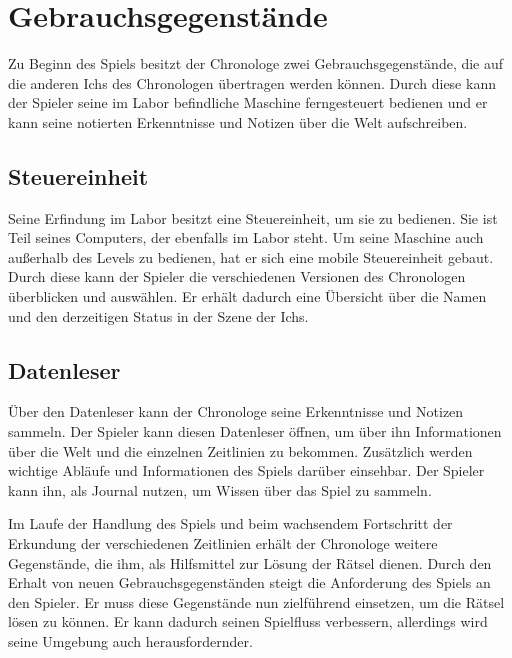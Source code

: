 \section{Gebrauchsgegenstände}
Zu Beginn des Spiels besitzt der Chronologe zwei Gebrauchsgegenstände, die auf die anderen Ichs des Chronologen übertragen werden können. Durch diese kann der Spieler seine im Labor befindliche Maschine ferngesteuert bedienen und er kann seine notierten Erkenntnisse und Notizen über die Welt aufschreiben.

\subsection{Steuereinheit}
Seine Erfindung im Labor besitzt eine Steuereinheit, um sie zu bedienen. Sie ist Teil seines Computers, der ebenfalls im Labor steht. Um seine Maschine auch außerhalb des Levels zu bedienen, hat er sich eine mobile Steuereinheit gebaut. Durch diese kann der Spieler die verschiedenen Versionen des Chronologen überblicken und auswählen. Er erhält dadurch eine Übersicht über die Namen und den derzeitigen Status in der Szene der Ichs.

\subsection{Datenleser}\label{sec:concept_datenleser}
Über den Datenleser kann der Chronologe seine Erkenntnisse und Notizen sammeln. Der Spieler kann diesen Datenleser öffnen, um über ihn Informationen über die Welt und die einzelnen Zeitlinien zu bekommen. Zusätzlich werden wichtige Abläufe und Informationen des Spiels darüber einsehbar. Der Spieler kann ihn, als Journal nutzen, um Wissen über das Spiel zu sammeln.

Im Laufe der Handlung des Spiels und beim wachsendem Fortschritt der Erkundung der verschiedenen Zeitlinien erhält der Chronologe weitere Gegenstände, die ihm, als Hilfsmittel zur Lösung der Rätsel dienen. Durch den Erhalt von neuen Gebrauchsgegenständen steigt die Anforderung des Spiels an den Spieler. Er muss diese Gegenstände nun zielführend einsetzen, um die Rätsel lösen zu können. Er kann dadurch seinen Spielfluss verbessern, allerdings wird seine Umgebung auch herausfordernder.

